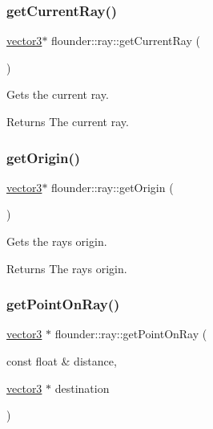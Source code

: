 \subsubsection{\texorpdfstring{get\+Current\+Ray()}{getCurrentRay()}}
{\footnotesize\ttfamily \hyperlink{classflounder_1_1vector3}{vector3}$\ast$ flounder\+::ray\+::get\+Current\+Ray (\begin{DoxyParamCaption}{ }\end{DoxyParamCaption})\hspace{0.3cm}{\ttfamily [inline]}}



Gets the current ray. 

\begin{DoxyReturn}{Returns}
The current ray. 
\end{DoxyReturn}
\mbox{\label{classflounder_1_1ray_af0a3765b066ae26607ca7a8b905b3d0b}} 
\subsubsection{\texorpdfstring{get\+Origin()}{getOrigin()}}
{\footnotesize\ttfamily \hyperlink{classflounder_1_1vector3}{vector3}$\ast$ flounder\+::ray\+::get\+Origin (\begin{DoxyParamCaption}{ }\end{DoxyParamCaption})\hspace{0.3cm}{\ttfamily [inline]}}



Gets the rays origin. 

\begin{DoxyReturn}{Returns}
The rays origin. 
\end{DoxyReturn}
\mbox{\label{classflounder_1_1ray_ae13e7a6d1df979371e75e7f7cfcec130}} 
\subsubsection{\texorpdfstring{get\+Point\+On\+Ray()}{getPointOnRay()}}
{\footnotesize\ttfamily \hyperlink{classflounder_1_1vector3}{vector3} $\ast$ flounder\+::ray\+::get\+Point\+On\+Ray (\begin{DoxyParamCaption}\item[{const float \&}]{distance,  }\item[{\hyperlink{classflounder_1_1vector3}{vector3} $\ast$}]{destination }\end{DoxyParamCaption})}



